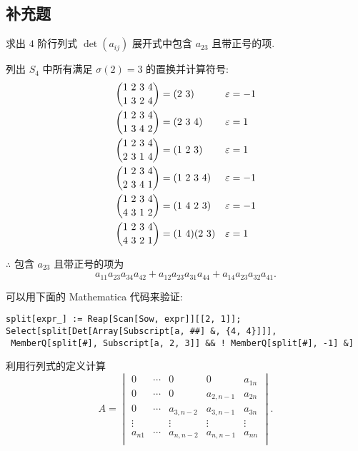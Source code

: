 \documentclass{ctexart}
\begin{document}
\subsection{补充题}
\begin{exercisec}[4.1.2]
    求出 $4$ 阶行列式 $\det(a_{ij})$ 展开式中包含 $a_{23}$ 且带正号的项.
\end{exercisec}
\begin{solution}
    列出 $S_4$ 中所有满足 $\sigma(2)=3$ 的置换并计算符号:
    \begin{align*}
        \dbinom{1\ 2\ 3\ 4}{1\ 3\ 2\ 4} & =(2\ 3) & \varepsilon & =-1 \\
        \dbinom{1\ 2\ 3\ 4}{1\ 3\ 4\ 2} & =(2\ 3\ 4) & \varepsilon & =1 \\
        \dbinom{1\ 2\ 3\ 4}{2\ 3\ 1\ 4} & =(1\ 2\ 3) & \varepsilon & =1 \\
        \dbinom{1\ 2\ 3\ 4}{2\ 3\ 4\ 1} & =(1\ 2\ 3\ 4) & \varepsilon & =-1 \\
        \dbinom{1\ 2\ 3\ 4}{4\ 3\ 1\ 2} & =(1\ 4\ 2\ 3) & \varepsilon & =-1 \\
        \dbinom{1\ 2\ 3\ 4}{4\ 3\ 2\ 1} & =(1\ 4)(2\ 3) & \varepsilon & =1 \\
    \end{align*}

    $\therefore$ 包含 $a_{23}$ 且带正号的项为
    \[a_{11}a_{23}a_{34}a_{42}+a_{12}a_{23}a_{31}a_{44}+a_{14}a_{23}a_{32}a_{41}.\]
\end{solution}
\begin{note}
    可以用下面的 Mathematica 代码来验证:
    \begin{verbatim}
split[expr_] := Reap[Scan[Sow, expr]][[2, 1]];
Select[split[Det[Array[Subscript[a, ##] &, {4, 4}]]], 
 MemberQ[split[#], Subscript[a, 2, 3]] && ! MemberQ[split[#], -1] &]\end{verbatim}
\end{note}
\begin{exercisec}[4.1.5]
    利用行列式的定义计算
    \[A=\begin{vmatrix}
        0 & \cdots & 0 & 0 & a_{1n} \\
        0 & \cdots & 0 & a_{2,n-1} & a_{2n} \\
        0 & \cdots & a_{3,n-2} & a_{3,n-1} & a_{3n} \\
        \vdots && \vdots & \vdots & \vdots \\
        a_{n1} & \cdots & a_{n,n-2} & a_{n,n-1} & a_{nn} \\
    \end{vmatrix}.\]
\end{exercisec}
\end{document}
